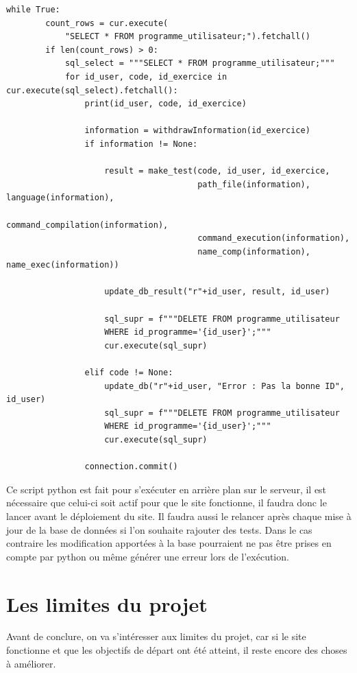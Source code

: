 \documentclass[a4paper]{article}
\begin{document}
  \begin{lstlisting}[language=PY]
    while True:
        count_rows = cur.execute(
            "SELECT * FROM programme_utilisateur;").fetchall()
        if len(count_rows) > 0:
            sql_select = """SELECT * FROM programme_utilisateur;"""
            for id_user, code, id_exercice in cur.execute(sql_select).fetchall():
                print(id_user, code, id_exercice)

                information = withdrawInformation(id_exercice)
                if information != None:

                    result = make_test(code, id_user, id_exercice,
                                       path_file(information), language(information),
                                       command_compilation(information),
                                       command_execution(information),
                                       name_comp(information), name_exec(information))

                    update_db_result("r"+id_user, result, id_user)

                    sql_supr = f"""DELETE FROM programme_utilisateur
                    WHERE id_programme='{id_user}';"""
                    cur.execute(sql_supr)

                elif code != None:
                    update_db("r"+id_user, "Error : Pas la bonne ID", id_user)
                    sql_supr = f"""DELETE FROM programme_utilisateur
                    WHERE id_programme='{id_user}';"""
                    cur.execute(sql_supr)

                connection.commit()
  \end{lstlisting}

  Ce script python est fait pour s'exécuter en arrière plan sur le serveur, il
  est nécessaire que celui-ci soit actif pour que le site fonctionne, il faudra
  donc le lancer avant le déploiement du site. Il faudra aussi le relancer
  après chaque mise à jour de la base de données si l'on souhaite rajouter des
  tests. Dans le cas contraire les modification apportées à la base pourraient
  ne pas être prises en compte par python ou même générer une erreur lors de
  l'exécution.

  \section{Les limites du projet}%
  \label{sec:Les limites du projet}

  Avant de conclure, on va s'intéresser aux limites du projet, car si le site
  fonctionne et que les objectifs de départ ont été atteint, il reste encore
  des choses à améliorer.
\end{document}
